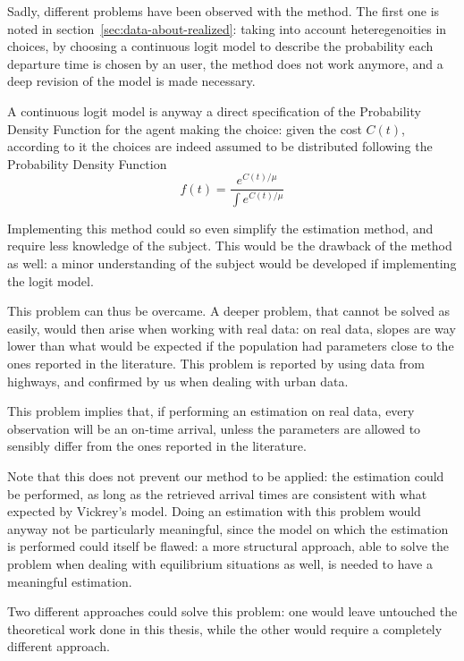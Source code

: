 Sadly, different problems have been observed with the method.
The first one is noted in section~\ref{sec:data-about-realized}:
taking into account heteregenoities in choices,
by choosing a continuous logit model to describe the probability each departure time is chosen by an user,
the method does not work anymore,
and a deep revision of the model is made necessary.

A continuous logit model is anyway a direct specification of the Probability Density Function for the agent making the choice:
given the cost \(C(t)\),
according to it the choices are indeed assumed to be distributed following the Probability Density Function
\begin{equation*}
  f(t) = \frac{e^{C(t)/\mu}}{\int e^{C(t)/\mu}}
\end{equation*}

Implementing this method could so even simplify the estimation method,
and require less knowledge of the subject.
This would be the drawback of the method as well:
a minor understanding of the subject would be developed if implementing the logit model.

This problem can thus be overcame.
A deeper problem, that cannot be solved as easily,
would then arise when working with real data:
on real data, slopes are way lower than what would be expected if the population had parameters close to the ones reported in the literature.
This problem is reported by \textcite{https://doi.org/10.1111/iere.12692} using data from highways,
and confirmed by us when dealing with urban data.

This problem implies that, if performing an estimation on real data,
every observation will be an on-time arrival,
unless the parameters are allowed to sensibly differ from the ones reported in the literature.

Note that this does not prevent our method to be applied:
the estimation could be performed,
as long as the retrieved arrival times are consistent with what expected by Vickrey's model.
Doing an estimation with this problem would anyway not be particularly meaningful,
since the model on which the estimation is performed could itself be flawed:
a more structural approach, able to solve the problem when dealing with equilibrium situations as well, is needed to have a meaningful estimation.

Two different approaches could solve this problem:
one would leave untouched the theoretical work done in this thesis,
while the other would require a completely different approach.

